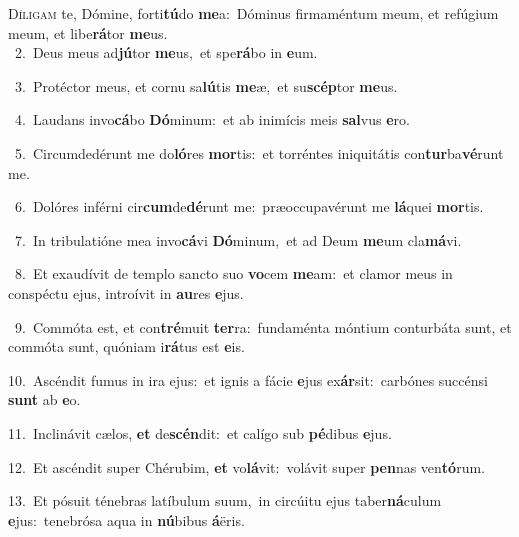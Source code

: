 \lettrine{\initial\textcolor{\initialcolor}{D}}{íligam} te, Dómine, forti\-\textbf{tú}\-do \textbf{me}\-a:~\star Dóminus firmaméntum meum, et refúgium meum, et libe\-\textbf{rá}\-tor \textbf{me}\-us.\\
{\numbfont\textcolor{\numbcolor}{~2.}}~Deus meus ad\-\textbf{jú}\-tor \textbf{me}\-us,~\star et spe\-\textbf{rá}\-bo in \textbf{e}\-um.\par
{\numbfont\textcolor{\numbcolor}{~3.}}~Protéctor meus, et cornu sa\-\textbf{lú}\-tis \textbf{me}\-æ,~\star et su\-\textbf{scép}\-tor \textbf{me}\-us.\par
{\numbfont\textcolor{\numbcolor}{~4.}}~Laudans invo\-\textbf{cá}\-bo \textbf{Dó}\-minum:~\star et ab inimícis meis \textbf{sal}\-vus \textbf{e}\-ro.\par
{\numbfont\textcolor{\numbcolor}{~5.}}~Circumdedérunt me do\-\textbf{ló}\-res \textbf{mor}\-tis:~\star et torréntes iniquitátis con\-\textbf{tur}\-ba\-\textbf{vé}\-runt me.\par
{\numbfont\textcolor{\numbcolor}{~6.}}~Dolóres inférni cir\-\textbf{cum}\-de\-\textbf{dé}\-runt me:~\star præoccupavérunt me \textbf{lá}\-quei \textbf{mor}\-tis.\par
{\numbfont\textcolor{\numbcolor}{~7.}}~In tribulatióne mea invo\-\textbf{cá}\-vi \textbf{Dó}\-minum,~\star et ad Deum \textbf{me}\-um cla\-\textbf{má}\-vi.\par
{\numbfont\textcolor{\numbcolor}{~8.}}~Et exaudívit de templo sancto suo \textbf{vo}\-cem \textbf{me}\-am:~\star et clamor meus in conspéctu ejus, introívit in \textbf{au}\-res \textbf{e}\-jus.\par
{\numbfont\textcolor{\numbcolor}{~9.}}~Commóta est, et con\-\textbf{tré}\-muit \textbf{ter}\-ra:~\star fundaménta móntium conturbáta sunt, et commóta sunt, quóniam i\-\textbf{rá}\-tus est \textbf{e}\-is.\par
{\numbfont\textcolor{\numbcolor}{10.}}~Ascéndit fumus in ira ejus:~\dagger et ignis a fácie \textbf{e}\-jus ex\-\textbf{ár}\-sit:~\star carbónes succénsi \textbf{sunt} ab \textbf{e}\-o.\par
{\numbfont\textcolor{\numbcolor}{11.}}~Inclinávit cælos, \textbf{et} de\-\textbf{scén}\-dit:~\star et calígo sub \textbf{pé}\-dibus \textbf{e}\-jus.\par
{\numbfont\textcolor{\numbcolor}{12.}}~Et ascéndit super Chérubim, \textbf{et} vo\-\textbf{lá}\-vit:~\star volávit super \textbf{pen}\-nas ven\-\textbf{tó}\-rum.\par
{\numbfont\textcolor{\numbcolor}{13.}}~Et pósuit ténebras latíbulum suum,~\dagger in circúitu ejus taber\-\textbf{ná}\-culum \textbf{e}\-jus:~\star tenebrósa aqua in \textbf{nú}\-bibus \textbf{á}\-ëris.\par

